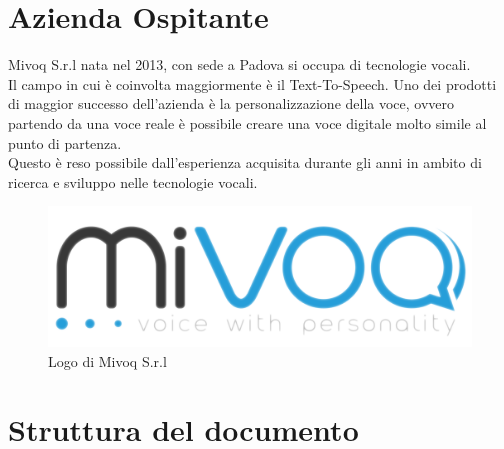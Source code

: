 \section{Azienda Ospitante}
Mivoq S.r.l nata nel 2013, con sede a Padova si occupa di tecnologie vocali.\\
Il campo in cui è coinvolta maggiormente è il Text-To-Speech. Uno dei prodotti di maggior successo dell'azienda è la personalizzazione della voce, ovvero partendo da una voce reale è possibile creare una voce digitale molto simile al punto di partenza.\\
Questo è reso possibile dall'esperienza acquisita durante gli anni in ambito di ricerca e sviluppo nelle tecnologie vocali.
\begin{figure}[H]
\centering
\includegraphics{images/logo-mivoq.png}
\caption{Logo di Mivoq S.r.l}
\end{figure}

\section{Struttura del documento}
 